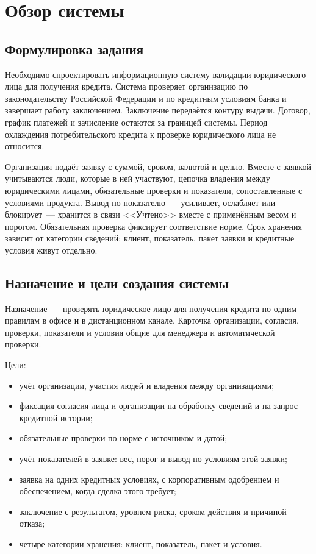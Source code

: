 \section{Обзор системы}

\subsection{Формулировка задания}

Необходимо спроектировать информационную систему валидации юридического лица для получения кредита. Система проверяет организацию по законодательству Российской Федерации и по кредитным условиям банка и завершает работу заключением. Заключение передаётся контуру выдачи. Договор, график платежей и зачисление остаются за границей системы. Период охлаждения потребительского кредита к проверке юридического лица не относится.

Организация подаёт заявку с суммой, сроком, валютой и целью. Вместе с заявкой учитываются люди, которые в ней участвуют, цепочка владения между юридическими лицами, обязательные проверки и показатели, сопоставленные с условиями продукта. Вывод по показателю~--- усиливает, ослабляет или блокирует~--- хранится в связи <<Учтено>> вместе с применённым весом и порогом. Обязательная проверка фиксирует соответствие норме. Срок хранения зависит от категории сведений: клиент, показатель, пакет заявки и кредитные условия живут отдельно.

\subsection{Назначение и цели создания системы}

Назначение~--- проверять юридическое лицо для получения кредита по одним правилам в офисе и в дистанционном канале. Карточка организации, согласия, проверки, показатели и условия общие для менеджера и автоматической проверки.

Цели:

\begin{itemize}
\item учёт организации, участия людей и владения между организациями;
\item фиксация согласия лица и организации на обработку сведений и на запрос кредитной истории;
\item обязательные проверки по норме с источником и датой;
\item учёт показателей в заявке: вес, порог и вывод по условиям этой заявки;
\item заявка на одних кредитных условиях, с корпоративным одобрением и обеспечением, когда сделка этого требует;
\item заключение с результатом, уровнем риска, сроком действия и причиной отказа;
\item четыре категории хранения: клиент, показатель, пакет и условия.
\end{itemize}

